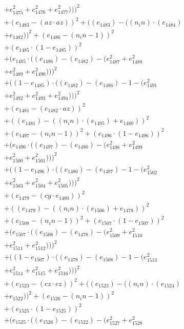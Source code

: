 \documentclass[10pt, a4paper]{article}
\begin{document}
\begin{small}
\begin{align*}
& + e_{1475}^{2} + e_{1476}^{2} + e_{1477}^{2})))^{2} \\
& + (e_{1483} - (az  \cdot  az))^{2} + ((e_{1483}) - ((n_in)  \cdot  (e_{1484}) \\
& + e_{1482}))^{2} + (e_{1486} - (n_in - 1))^{2} \\
& + (e_{1485}  \cdot  (1 - e_{1485}))^{2} \\
& + (e_{1485}  \cdot  ((e_{1486}) - (e_{1482}) - (e_{1487}^{2} + e_{1488}^{2} \\
& + e_{1489}^{2} + e_{1490}^{2})))^{2} \\
& + ((1 - e_{1485})  \cdot  ((e_{1482}) - (e_{1486}) - 1 - (e_{1491}^{2} \\
& + e_{1492}^{2} + e_{1493}^{2} + e_{1494}^{2})))^{2} \\
& + (e_{1481} - (e_{1482}  \cdot  az))^{2} \\
& + ((e_{1481}) - ((n_in)  \cdot  (e_{1495}) + e_{1480}))^{2} \\
& + (e_{1497} - (n_in - 1))^{2} + (e_{1496}  \cdot  (1 - e_{1496}))^{2} \\
& + (e_{1496}  \cdot  ((e_{1497}) - (e_{1480}) - (e_{1498}^{2} + e_{1499}^{2} \\
& + e_{1500}^{2} + e_{1501}^{2})))^{2} \\
& + ((1 - e_{1496})  \cdot  ((e_{1480}) - (e_{1497}) - 1 - (e_{1502}^{2} \\
& + e_{1503}^{2} + e_{1504}^{2} + e_{1505}^{2})))^{2} \\
& + (e_{1479} - (cy  \cdot  e_{1480}))^{2} \\
& + ((e_{1479}) - ((n_in)  \cdot  (e_{1506}) + e_{1478}))^{2} \\
& + (e_{1508} - (n_in - 1))^{2} + (e_{1507}  \cdot  (1 - e_{1507}))^{2} \\
& + (e_{1507}  \cdot  ((e_{1508}) - (e_{1478}) - (e_{1509}^{2} + e_{1510}^{2} \\
& + e_{1511}^{2} + e_{1512}^{2})))^{2} \\
& + ((1 - e_{1507})  \cdot  ((e_{1478}) - (e_{1508}) - 1 - (e_{1513}^{2} \\
& + e_{1514}^{2} + e_{1515}^{2} + e_{1516}^{2})))^{2} \\
& + (e_{1523} - (cz  \cdot  cz))^{2} + ((e_{1523}) - ((n_in)  \cdot  (e_{1524}) \\
& + e_{1522}))^{2} + (e_{1526} - (n_in - 1))^{2} \\
& + (e_{1525}  \cdot  (1 - e_{1525}))^{2} \\
& + (e_{1525}  \cdot  ((e_{1526}) - (e_{1522}) - (e_{1527}^{2} + e_{1528}^{2} \\

\end{align*}
\end{small}
\end{document}
